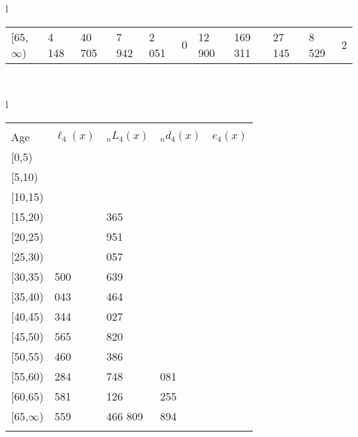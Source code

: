 \documentclass[
]{article}
\begin{document}
\begin{table}
\begin{tabular}[t]{l}
\begin{tabular}
{}[65,$\infty$) & 4 148 & 40 705 & 7 942 & 2 051 & 0 & 12 900 & 169 311 & 27 145 & 8 529 & 2\\
\end{tabular}\\
\end{tabular}
\centering
\begin{tabular}[t]{l}
\hline
\begin{tabular}{>{\raggedright\arraybackslash}p{.43in}>{\raggedleft\arraybackslash}p{1.3in}>{\raggedleft\arraybackslash}p{1.3in}>{\raggedleft\arraybackslash}p{1.3in}>{\raggedleft\arraybackslash}p{1.3in}}
\toprule
\multicolumn{1}{c}{ } & \multicolumn{4}{c}{(4) Lost both} \\
\cmidrule(l{3pt}r{3pt}){2-5}
Age & $\ell_{4}(x)$ & ${}_nL_{4}(x)$ & ${}_nd_{4}(x)$ & $e_{4}(x)$\\
\midrule
{}[0,5) & 0 & 162 & 0 & 22\\
{}[5,10) & 59 & 441 & 0 & 22\\
{}[10,15) & 117 & 690 & 0 & 22\\
{}[15,20) & 177 & 1 365 & 0 & 22\\
{}[20,25) & 409 & 2 951 & 2 & 22\\
\addlinespace
{}[25,30) & 807 & 6 057 & 5 & 22\\
{}[30,35) & 1 500 & 11 639 & 13 & 22\\
{}[35,40) & 3 043 & 22 464 & 34 & 22\\
{}[40,45) & 5 344 & 41 027 & 81 & 22\\
{}[45,50) & 9 565 & 69 820 & 197 & 22\\
\addlinespace
{}[50,55) & 16 460 & 118 386 & 483 & 21\\
{}[55,60) & 27 284 & 177 748 & 1 081 & 20\\
{}[60,65) & 40 581 & 255 126 & 2 255 & 19\\
{}[65,$\infty$) & 55 559 & 1 466 809 & 73 894 & 17\\
\bottomrule
\multicolumn{5}{l}{\rule{0pt}{1em}\textsuperscript{*} Based on an estimated from SIPP with less than 10 respondents in the numerator.}\\
\end{tabular}\\
\end{tabular}
\end{table}
\end{document}
